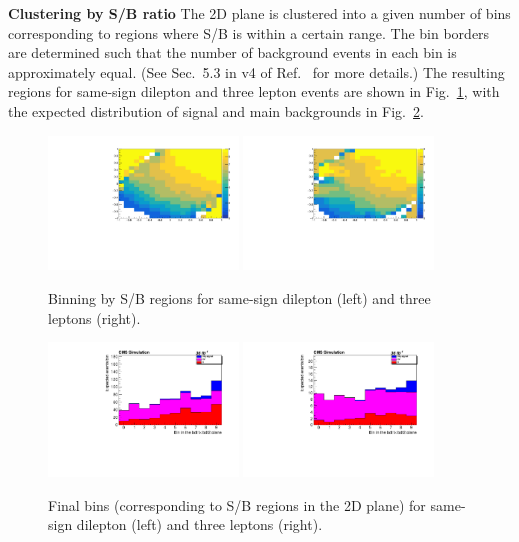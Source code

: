 \textbf{Clustering by S/B ratio}
The 2D plane is clustered into a given number of bins corresponding to regions where S/B is within a certain range.
The bin borders are determined such that the number of background events in each bin is approximately equal.
(See Sec.~5.3 in v4 of Ref.~\cite{CMS_AN_2017-029} for more details.)
The resulting regions for same-sign dilepton and three lepton events are shown in Fig.~\ref{fig:sbbinning}, with the expected distribution of signal and main backgrounds in Fig.~\ref{fig:sbfinalbins}.

\begin{figure} [!h]
 \centering
 \includegraphics[width=0.45\textwidth]{figures/binning/hTargetBinning_2lss.pdf}
 \includegraphics[width=0.45\textwidth]{figures/binning/hTargetBinning_3l.pdf}
\caption{Binning by S/B regions for same-sign dilepton (left) and three leptons (right).}
\label{fig:sbbinning}
\end{figure}

\begin{figure} [!h]
 \centering
 \includegraphics[width=0.45\textwidth]{figures/binning/likelihoodBased_1d_2lss.pdf}
 \includegraphics[width=0.45\textwidth]{figures/binning/likelihoodBased_1d_3l.pdf}
\caption{Final bins (corresponding to S/B regions in the 2D plane) for same-sign dilepton (left) and three leptons (right).}
\label{fig:sbfinalbins}
\end{figure}

